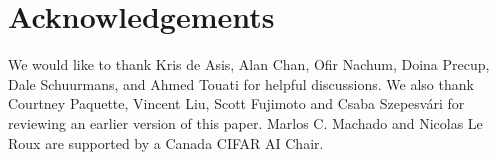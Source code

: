 \section*{Acknowledgements}
We would like to thank Kris de Asis, Alan Chan, Ofir Nachum, Doina Precup, Dale Schuurmans, and Ahmed Touati for helpful discussions. We also thank Courtney Paquette, Vincent Liu, Scott Fujimoto and Csaba Szepesv\'{a}ri for reviewing an earlier version of this paper. Marlos C. Machado and Nicolas Le Roux are supported by a Canada CIFAR AI Chair.



